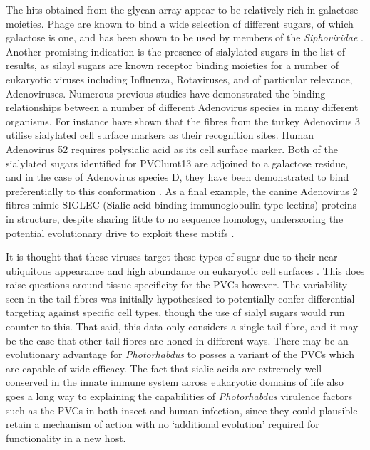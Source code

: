 The hits obtained from the glycan array appear to be relatively rich in galactose moieties. Phage are known to bind a wide selection of different sugars, of which galactose is one, and has been shown to be used by members of the \emph{Siphoviridae} \citep{BertozziSilva2016}. Another promising indication is the presence of sialylated sugars in the list of results, as silayl sugars are known receptor binding moieties for a number of eukaryotic viruses including Influenza, Rotaviruses, and of particular relevance, Adenoviruses. Numerous previous studies have demonstrated the binding relationships between a number of different Adenovirus species in many different organisms. For instance \cite{Singh2015} have shown that the fibres from the turkey Adenovirus 3 utilise sialylated cell surface markers as their recognition sites. Human Adenovirus 52 requires polysialic acid as its cell surface marker. Both of the sialylated sugars identified for PVClumt13 are adjoined to a galactose residue, and in the case of Adenovirus species D, they have been demonstrated to bind preferentially to this conformation \citep{Burmeister2004}. As a final example, the canine Adenovirus 2 fibres mimic SIGLEC  (Sialic acid-binding immunoglobulin-type lectins) proteins in structure, despite sharing little to no sequence homology, underscoring the potential evolutionary drive to exploit these motifs \citep{Rademacher2012}.

It is thought that these viruses target these types of sugar due to their near ubiquitous appearance and high abundance on eukaryotic cell surfaces \citep{Varki2012}. This does raise questions around tissue specificity for the PVCs however. The variability seen in the tail fibres was initially hypothesised to potentially confer differential targeting against specific cell types, though the use of sialyl sugars would run counter to this. That said, this data only considers a single tail fibre, and it may be the case that other tail fibres are honed in different ways. There may be an evolutionary advantage for \emph{Photorhabdus} to posses a variant of the PVCs which are capable of wide efficacy. The fact that sialic acids are extremely well conserved in the innate immune system across eukaryotic domains of life also goes a long way to explaining the capabilities of \emph{Photorhabdus} virulence factors such as the PVCs in both insect and human infection, since they could plausible retain a mechanism of action with no `additional evolution' required for functionality in a new host.

